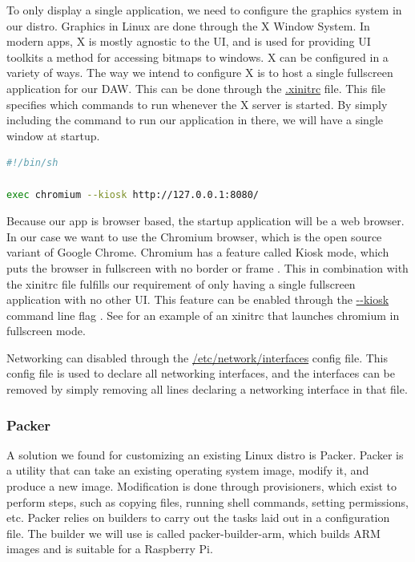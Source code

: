 To only display a single application, we need to configure the graphics system in our
distro. Graphics in Linux are done through the X Window System. In modern apps, X is
mostly agnostic to the UI, and is used for providing UI toolkits a method for accessing
bitmaps to windows. X can be configured in a variety of ways. The way we intend to
configure X is to host a single fullscreen application for our DAW. This can be done
through the \url{.xinitrc} file. This file specifies which commands to run whenever the X
server is started. By simply including the command to run our application in there, we
will have a single window at startup.

\begin{lstlisting}[language=bash, label={lst:xinitrc}, caption=Example .xinitrc]
#!/bin/sh

exec chromium --kiosk http://127.0.0.1:8080/
\end{lstlisting}

Because our app is browser based, the startup application will be a web browser. In our
case we want to use the Chromium browser, which is the open source variant of Google
Chrome. Chromium has a feature called Kiosk mode, which puts the browser in fullscreen
with no border or frame \autocite{chromiumKioskMode}. This in combination with the xinitrc
file fulfills our requirement of only having a single fullscreen application with no other
UI. This feature can be enabled through the \url{--kiosk} command line flag
\autocite{chromiumKioskMode}. See  for an example of an xinitrc that
launches chromium in fullscreen mode.

Networking can disabled through the \url{/etc/network/interfaces} config file. This config
file is used to declare all networking interfaces, and the interfaces can be removed by
simply removing all lines declaring a networking interface in that file.

\subsubsection{Packer}

A solution we found for customizing an existing Linux distro is Packer. Packer is a
utility that can take an existing operating system image, modify it, and produce a new
image. Modification is done through provisioners, which exist to perform steps, such as
copying files, running shell commands, setting permissions, etc. Packer relies on builders
to carry out the tasks laid out in a configuration file. The builder we will use is called
packer-builder-arm, which builds ARM images and is suitable for a Raspberry Pi.

